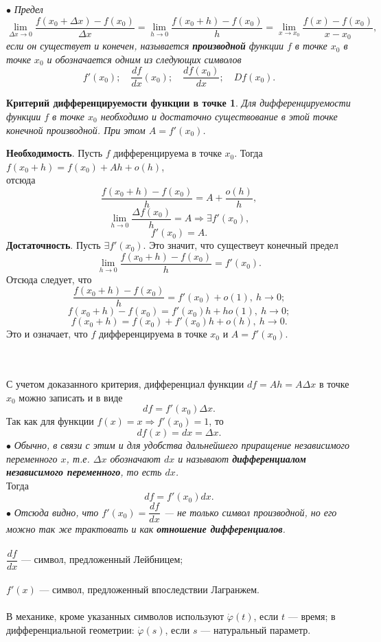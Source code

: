$\bullet$ \textit{Предел \[\lim_{\Delta x\to 0}\frac{f(x_0+\Delta x)-f(x_0)}{\Delta x}=\lim_{h\to 0}\frac{f(x_0+h)-f(x_0)}{h}=\lim_{x\to x_0}\frac{f(x)-f(x_0)}{x-x_0},\] если он существует и конечен, называется \textbf{производной} функции $f$ в точке $x_0$ в точке $x_0$ и обозначается одним из следующих символов $$f'(x_0);\quad\frac{d f}{d x}(x_0);\quad\frac{d f(x_0)}{d x};\quad D f(x_0).$$}
\newtheorem*{krdif}{Критерий дифференцируемости функции в точке}
\begin{krdif}
	Для дифференцируемости функции $f$ в точке $x_0$ необходимо и достаточно существование в этой точке конечной производной. При этом $A=f'(x_0)$.
\end{krdif}
\begin{Proof}
	\textbf{Необходимость}. Пусть $f$ дифференцируема в точке $x_0$. Тогда $f(x_0+h)=f(x_0)+A h+ o(h)$,\\ отсюда $$\frac {f(x_0+h)-f(x_0)}{h}=A+\frac{o(h)}{h},$$ \[\lim_{h\to 0}\frac{\Delta f(x_0)}{h}=A \Rightarrow \exists f'(x_0),\] $$f'(x_0)=A.$$
	\textbf{Достаточность}. Пусть $\exists f'(x_0)$. Это значит, что существеут конечный предел \[\lim_{h\to 0}\frac {f(x_0+h)-f(x_0)}{h}=f'(x_0).\]
	Отсюда следует, что $$\frac{f(x_0+h)-f(x_0)}{h}=f'(x_0)+ o(1),\ {h\to 0};$$
	$$f(x_0+h)-f(x_0)=f'(x_0) h+h o(1),\ h\to 0;$$
	$$f(x_0+h)=f(x_0)+f'(x_0) h+ o(h),\ h\to 0.$$ Это  и означает, что $f$ дифференцируема в точке $x_0$ и $A=f'(x_0)$.
\end{Proof}\\\\
С учетом доказанного критерия, дифференциал функции $d f=A h=A \Delta x$ в точке $x_0$ можно записать и в виде $$d f=f'(x_0)\Delta x.$$
Так как для функции $f(x)=x\Rightarrow f'(x_0)=1$, то $$d f(x)=d x=\Delta x.$$
$\bullet$ \textit{Обычно, в связи с этим и для удобства дальнейшего приращение независимого переменного $x$, т.е. $\Delta x$ обозначают $d x$ и называют \textbf{дифференциалом независимого переменного}, то есть $d x$.}\\
Тогда $$d f=f'(x_0) d x.$$
$\bullet$ \textit{Отсюда видно, что $f'(x_0)=\dfrac{d f}{d x}$ --- не только символ производной, но его можно так же трактовать и как \textbf{отношение дифференциалов}.}\\\\
$\dfrac{d f}{d x}$ --- символ, предложенный Лейбницем;\\\\
$f'(x)$ --- символ, предложенный впоследствии Лагранжем.\\\\
В механике, кроме указанных символов используют $\dot\varphi (t)$, если $t$ --- время; в дифференциальной геометрии: $\dot\varphi(s)$, если $s$ --- натуральный параметр.
